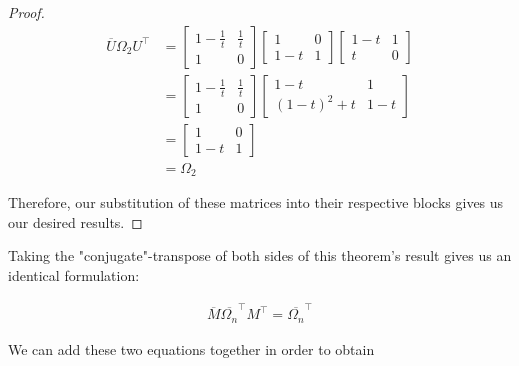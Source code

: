 \begin{proof}
\begin{equation}
	\begin{aligned}
		\overline{U}\Omega_2U^\intercal &= \begin{bmatrix}
													1-\frac{1}{t} & \frac{1}{t}\\
													1 & 0 
													\end{bmatrix}
													\begin{bmatrix}
													1 & 0\\
													1-t & 1 
													\end{bmatrix}
													\begin{bmatrix}
													1-t & 1\\
													t & 0 
													\end{bmatrix}\\
												&= \begin{bmatrix}
													1-\frac{1}{t} & \frac{1}{t}\\
													1 & 0 
													\end{bmatrix}
													\begin{bmatrix}
													1-t & 1\\
													(1-t)^2 + t & 1-t 
													\end{bmatrix}\\
												&= \begin{bmatrix}
													1 & 0\\
													1-t & 1 
													\end{bmatrix} \\
												&= \Omega_2
	\end{aligned}
\end{equation}

Therefore, our substitution of these matrices into their respective blocks gives us our desired results. \end{proof} 

Taking the "conjugate"-transpose of both sides of this theorem's result gives us an identical formulation:

\begin{equation}
	\begin{aligned}
		\overline{M} \overline{\Omega_n}^\intercal M^\intercal = \overline{\Omega_n}^\intercal
	\end{aligned}
\end{equation}

We can add these two equations together in order to obtain

